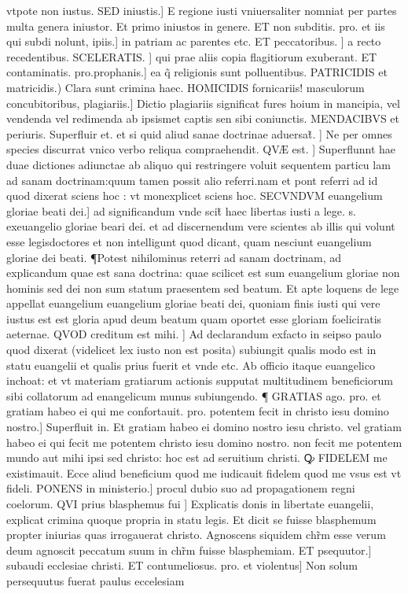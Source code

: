 \documentclass{article}
\begin{document}
\begin{pages}
vtpote non iustus. SED iniustis.] E regione iusti vniuersaliter  nomniat per partes multa genera iniustor. Et primo iniustos in genere. ET non subditis. pro. et iis qui subdi nolunt, ipiis.] in patriam ac parentes etc.  ET peccatoribus. ] a recto recedentibus. SCELERATIS. ] qui prae aliis copia flagitiorum exuberant. ET contaminatis. pro.prophanis.] ea q̃ religionis sunt polluentibus. PATRICIDIS et matricidis.) Clara sunt crimina haec. HOMICIDIS  fornicariis! masculorum concubitoribus, plagiariis.] Dictio plagiariis significat fures hoium in mancipia, vel vendenda vel redimenda ab ipsismet captis sen sibi coniunctis. MENDACIBVS et periuris. Superfluir et. et si quid aliud sanae doctrinae aduersat̃. ] Ne per omnes species discurrat  vnico verbo reliqua compraehendit. QVÆ est. ] Superflunnt hae duae dictiones adiunctae ab aliquo qui restringere voluit sequentem particu lam ad sanam doctrinam:quum tamen possit alio referri.nam et pont referri ad id quod dixerat  sciens hoc : vt monexplicet sciens hoc. SECVNDVM euangelium gloriae beati dei.]  ad significandum vnde scit̃ haec libertas iusti a lege. s. exeuangelio gloriae beari dei. et ad discernendum vere scientes ab illis qui volunt esse legisdoctores et non intelligunt quod  dicant, quam nesciunt euangelium gloriae dei beati. ¶Potest nihilominus reterri ad sanam doctrinam, ad explicandum quae est sana doctrina: quae scilicet est sum euangelium gloriae non hominis sed dei  non sum statum praesentem sed beatum. Et apte loquens de lege  appellat euangelium euangelium gloriae beati dei, quoniam finis iusti qui vere iustus est  est gloria apud deum beatum quam oportet esse gloriam foeliciratis aeternae. QVOD creditum est mihi. ] Ad declarandum exfacto in seipso paulo quod dixerat (videlicet lex iusto non est posita) subiungit qualis modo est in statu euangelii et qualis prius fuerit  et vnde etc.  Ab officio itaque  euangelico inchoat: et vt materiam gratiarum actionis supputat multitudinem beneficiorum sibi collatorum ad enangelicum munus  subiungendo. ¶ GRATIAS ago. pro. et gratiam habeo  ei qui me confortauit. pro. potentem fecit  in christo iesu domino nostro.] Superfluit in. Et gratiam habeo ei domino nostro iesu christo. vel gratiam habeo ei  qui fecit me potentem christo iesu domino nostro. non fecit me potentem mundo aut mihi ipsi sed christo: hoc est ad seruitium christi. Ꝙ FIDELEM me existimauit. Ecce aliud beneficium quod me iudicauit fidelem  quod me vsus est vt fideli. PONENS in ministerio.] procul dubio suo ad propagationem regni coelorum. QVI prius blasphemus fui ] Explicatis donis in libertate euangelii, explicat crimina quoque  propria in statu legis. Et dicit se fuisse blasphemum  propter iniurias quas irrogauerat christo. Agnoscens siquidem chr̃m esse verum deum  agnoscit peccatum suum in chr̃m fuisse blasphemiam. ET psequutor.] subaudi ecclesiae christi. ET contumeliosus. pro. et violentus] Non solum persequutus fuerat paulus eccelesiam  \pend

\end{pages}
\end{document}

